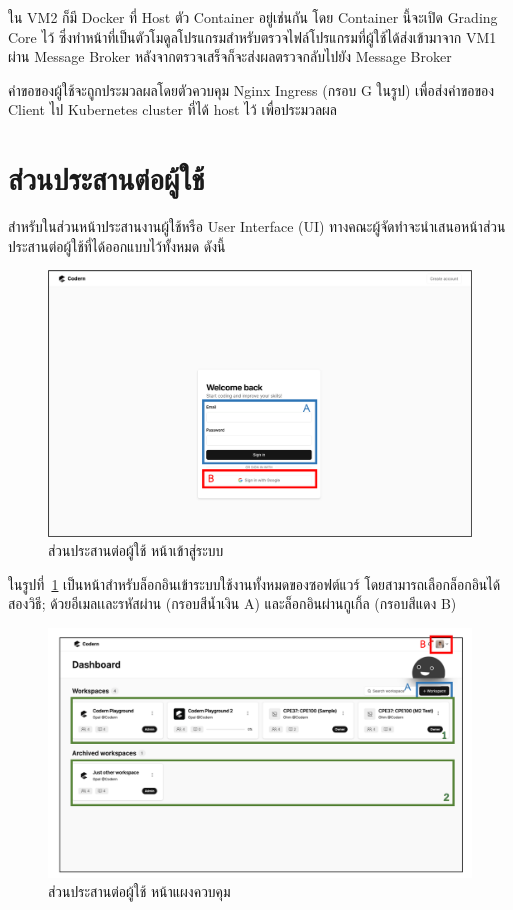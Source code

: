 \documentclass[12pt,one side,openright,a4paper]{cpe-thesis-th}
\newcommand{\thaijustify}[1]{%
  \par\hspace{30pt}\justifying
  #1
}
\begin{document}
\thaijustify{
  ใน VM2 ก็มี Docker ที่ Host ตัว Container อยู่เช่นกัน โดย Container นี้จะเปิด Grading Core ไว้ ซึ่งทำหน้าที่เป็นตัวโมดูลโปรแกรมสำหรับตรวจไฟล์โปรแกรมที่ผู้ใช้ได้ส่งเข้ามาจาก VM1 ผ่าน Message Broker หลังจากตรวจเสร็จก็จะส่งผลตรวจกลับไปยัง Message Broker
}
\thaijustify{
  คำขอของผู้ใช้จะถูกประมวลผลโดยตัวควบคุม Nginx Ingress (กรอบ G ในรูป) เพื่อส่งคำขอของ Client ไป Kubernetes cluster ที่ได้ host ไว้ เพื่อประมวลผล
}
\pagebreak
\section{ส่วนประสานต่อผู้ใช้}
\thaijustify{
  สำหรับในส่วนหน้าประสานงานผู้ใช้หรือ User Interface (UI) ทางคณะผู้จัดทำจะนำเสนอหน้าส่วนประสานต่อผู้ใช้ที่ได้ออกแบบไว้ทั้งหมด ดังนี้
}
\hypertarget{ui-login}{
  \begin{figure}[H]
    \centering
    \includegraphics[width=15cm]{figure/ui/ui-login1.png}
    \caption[ส่วนประสานต่อผู้ใช้ หน้าเข้าสู่ระบบ]{ส่วนประสานต่อผู้ใช้ หน้าเข้าสู่ระบบ}
    \label{fig:ui-login}
  \end{figure}
}

\thaijustify{
  ในรูปที่~\ref{fig:ui-login} เป็นหน้าสำหรับล็อกอินเข้าระบบใช้งานทั้งหมดของซอฟต์แวร์ โดยสามารถเลือกล็อกอินได้สองวิธี; ด้วยอีเมลเเละรหัสผ่าน (กรอบสีน้ำเงิน A) และล็อกอินผ่านกูเกิ้ล (กรอบสีแดง B)
}

\hypertarget{ui-dashboard1}{
  \begin{figure}[H]
    \centering
    \includegraphics[width=15cm]{figure/ui/ui-dashboard1.png}
    \caption[ส่วนประสานต่อผู้ใช้ หน้าแผงควบคุม]{ส่วนประสานต่อผู้ใช้ หน้าแผงควบคุม}
    \label{fig:ui-dashboard1}
  \end{figure}
}
\end{document}
